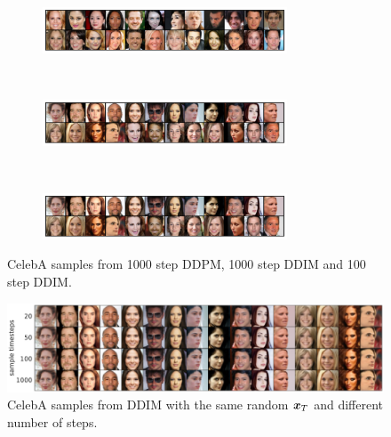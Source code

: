 \begin{figure}
    \centering
    \begin{subfigure}{\textwidth}
    \centering
    \includegraphics[width=0.8\textwidth]{figures/celeba-samples-uniform-1000-ddpm.pdf}
    \end{subfigure}
    ~
    \begin{subfigure}{\textwidth}
    \centering
    \includegraphics[width=0.8\textwidth]{figures/celeba-samples-uniform-1000-ddim.pdf}
    \end{subfigure}
    ~
    \begin{subfigure}{\textwidth}
    \centering
    \includegraphics[width=0.8\textwidth]{figures/celeba-samples-uniform-100-ddim.pdf}
    \end{subfigure}
    \caption{CelebA samples from 1000 step DDPM, 1000 step DDIM and 100 step DDIM.}
    \label{fig:celeba-samples}
\end{figure}

\begin{figure}
    \centering
    \includegraphics[width=\textwidth]{figures/celeba-consistency.pdf}
    \caption{CelebA samples from DDIM with the same random ${\bm{x}}_T$ and different number of steps.}
    \label{fig:celeba-consistency}
\end{figure}

